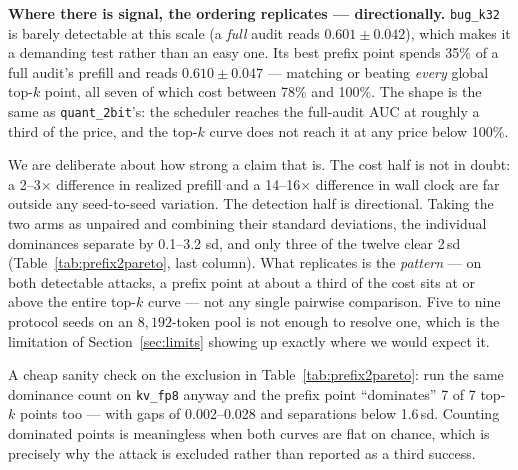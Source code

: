 \documentclass[11pt]{article}
\begin{document}
\begin{table}[h]
\centering\small

\caption{[new] The honest Pareto plane, restricted to the attacks that are
detectable at all at this scale (\texttt{kv\_fp8} is excluded: its full audit reads
$0.507 \pm 0.005$, so every comparison over it is noise against noise). ``Dominated''
counts global top-$k$ operating points that cost strictly more \emph{and} detect
strictly less than the single prefix-scheduled point in column 2.}
\label{tab:prefix2pareto}
\end{table}

\textbf{Where there is signal, the ordering replicates --- directionally.}
\texttt{bug\_k32} is barely detectable at this scale (a \emph{full} audit reads
$0.601 \pm 0.042$), which makes it a demanding test rather than an easy one. Its
best prefix point spends 35\% of a full audit's prefill and reads
$0.610 \pm 0.047$ --- matching or beating \emph{every} global top-$k$ point, all
seven of which cost between 78\% and 100\%. The shape is the same as
\texttt{quant\_2bit}'s: the scheduler reaches the full-audit AUC at roughly a third
of the price, and the top-$k$ curve does not reach it at any price below 100\%.

We are deliberate about how strong a claim that is. The cost half is not in doubt:
a 2--3$\times$ difference in realized prefill and a 14--16$\times$ difference in
wall clock are far outside any seed-to-seed variation. The detection half is
directional. Taking the two arms as unpaired and combining their standard
deviations, the individual dominances separate by 0.1--3.2 sd, and only three of
the twelve clear 2\,sd (Table~\ref{tab:prefix2pareto}, last column). What
replicates is the \emph{pattern} --- on both detectable attacks, a prefix point at
about a third of the cost sits at or above the entire top-$k$ curve --- not any
single pairwise comparison. Five to nine protocol seeds on an $8{,}192$-token pool
is not enough to resolve one, which is the limitation of
Section~\ref{sec:limits} showing up exactly where we would expect it.

A cheap sanity check on the exclusion in Table~\ref{tab:prefix2pareto}: run the
same dominance count on \texttt{kv\_fp8} anyway and the prefix point ``dominates''
7 of 7 top-$k$ points too --- with gaps of 0.002--0.028 and separations below
1.6\,sd. Counting dominated points is meaningless when both curves are flat on
chance, which is precisely why the attack is excluded rather than reported as a
third success.
\end{document}
